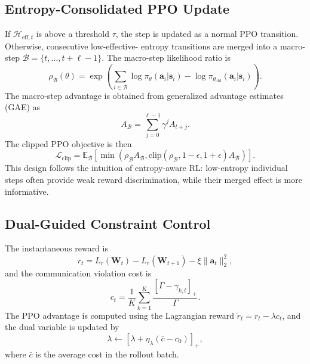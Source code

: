 \documentclass[10pt,journal]{IEEEtran}
\newcommand{\vect}[1]{\mathbf{#1}}
\newcommand{\mat}[1]{\mathbf{#1}}
\newcommand{\E}{\mathbb{E}}
\begin{document}
\subsection{Entropy-Consolidated PPO Update}
If $\mathcal{H}_{\mathrm{eff},t}$ is above a threshold $\tau$, the step is
updated as a normal PPO transition. Otherwise, consecutive low-effective-
entropy transitions are merged into a macro-step
$\mathcal{B}=\{t,\ldots,t+\ell-1\}$. The macro-step likelihood ratio is
\begin{equation}
    \rho_{\mathcal{B}}(\theta)
    =
    \exp\left(
    \sum_{i\in\mathcal{B}}
    \log\pi_\theta(\vect{a}_i|\vect{s}_i)
    -
    \log\pi_{\theta_{\mathrm{old}}}(\vect{a}_i|\vect{s}_i)
    \right).
\end{equation}
The macro-step advantage is obtained from generalized advantage estimates
(GAE) as
\begin{equation}
    A_{\mathcal{B}}=\sum_{j=0}^{\ell-1}\gamma^j A_{t+j}.
\end{equation}
The clipped PPO objective is then
\begin{equation}
    \mathcal{L}_{\mathrm{clip}}
    =
    \E_{\mathcal{B}}
    \left[
    \min\left(
    \rho_{\mathcal{B}} A_{\mathcal{B}},
    \mathrm{clip}(\rho_{\mathcal{B}},1-\epsilon,1+\epsilon)A_{\mathcal{B}}
    \right)
    \right].
\end{equation}
This design follows the intuition of entropy-aware RL: low-entropy
individual steps often provide weak reward discrimination, while their
merged effect is more informative.

\subsection{Dual-Guided Constraint Control}
The instantaneous reward is
\begin{equation}
    r_t =
    L_r(\mat{W}_{t})-L_r(\mat{W}_{t+1})
    -\xi\|\vect{a}_t\|_2^2 ,
\end{equation}
and the communication violation cost is
\begin{equation}
    c_t=
    \frac{1}{K}\sum_{k=1}^{K}
    \frac{[\Gamma-\gamma_{k,t}]_+}{\Gamma}.
\end{equation}
The PPO advantage is computed using the Lagrangian reward
$\tilde{r}_t=r_t-\lambda c_t$, and the dual variable is updated by
\begin{equation}
    \lambda \leftarrow
    \left[\lambda+\eta_\lambda(\bar{c}-c_0)\right]_+,
\end{equation}
where $\bar{c}$ is the average cost in the rollout batch.
\end{document}
